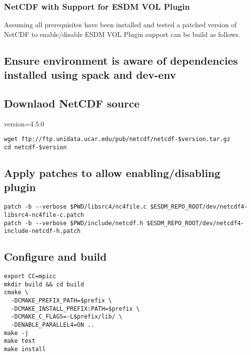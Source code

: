 \subsubsection{NetCDF with Support for ESDM VOL Plugin}%
\label{netcdf-with-support-for-esdm-vol-plugin}

Assuming all prerequisites have been installed and tested a patched
version of NetCDF to enable/disable ESDM VOL Plugin support can be build
as follows.

\subsection{Ensure environment is aware of dependencies installed using spack and dev-env}%
\label{ensure-environment-is-aware-of-dependencies-installed-using-spack-and-dev-env-1}

\subsection{Downlaod NetCDF source}%
\label{downlaod-netcdf-source}

version=4.5.0

\begin{lstlisting}
wget ftp://ftp.unidata.ucar.edu/pub/netcdf/netcdf-$version.tar.gz
cd netcdf-$version
\end{lstlisting}

\subsection{Apply patches to allow enabling/disabling plugin}%
\label{apply-patches-to-allow-enablingdisabling-plugin}

\begin{lstlisting}
patch -b --verbose $PWD/libsrc4/nc4file.c $ESDM_REPO_ROOT/dev/netcdf4-libsrc4-nc4file-c.patch
patch -b --verbose $PWD/include/netcdf.h $ESDM_REPO_ROOT/dev/netcdf4-include-netcdf-h.patch
\end{lstlisting}

\subsection{Configure and build}%
\label{configure-and-build}

\begin{lstlisting}
export CC=mpicc
mkdir build && cd build
cmake \
  -DCMAKE_PREFIX_PATH=$prefix \
  -DCMAKE_INSTALL_PREFIX:PATH=$prefix \
  -DCMAKE_C_FLAGS=-L$prefix/lib/ \
  -DENABLE_PARALLEL4=ON ..
make -j
make test
make install
\end{lstlisting}

